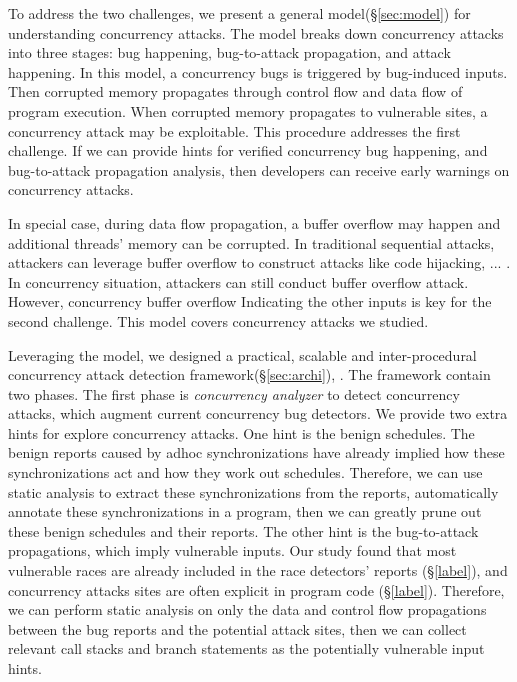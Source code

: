 
To address the two challenges, we present a general model(\S\ref{sec:model}) 
for understanding concurrency attacks.
The model breaks down concurrency attacks into three stages: bug happening, 
bug-to-attack propagation, and attack happening. 
In this model, 
a concurrency bugs is triggered by bug-induced inputs. Then corrupted memory 
propagates through control flow and data flow of program execution. 
When corrupted memory propagates to vulnerable sites, a concurrency attack may be exploitable. 
This procedure addresses the first challenge. If we can provide hints for verified concurrency bug happening, 
and bug-to-attack propagation analysis, 
then developers can receive early warnings on concurrency attacks.

In special case, 
during data flow propagation, a buffer overflow may happen and additional threads' memory can be corrupted.  
In traditional sequential attacks, attackers can leverage buffer overflow to construct attacks like 
code hijacking, ... \cite{}. In concurrency situation, attackers can still conduct buffer overflow attack. 
However, concurrency buffer overflow   
Indicating the other inputs is key for the second challenge. 
This model covers \nattacks concurrency attacks we studied. 


Leveraging the model, we designed a practical, scalable and inter-procedural concurrency 
attack detection framework(\S\ref{sec:archi}), \xxx. 
The framework contain two phases.
The first phase is \emph{concurrency analyzer} to detect concurrency attacks, 
which augment current concurrency bug detectors.  
We provide two extra hints for explore concurrency attacks.
One hint is the benign schedules. The benign reports caused by adhoc
synchronizations have already implied how these synchronizations
act and how they work out schedules. Therefore, we
can use static analysis to extract these synchronizations from
the reports, automatically annotate these synchronizations in
a program, then we can greatly prune out these benign schedules
and their reports. The other hint is the bug-to-attack propagations, which
imply vulnerable inputs. Our study found that most vulnerable
races are already included in the race detectors’ reports
(\S\ref{label}), and concurrency attacks sites are often explicit in program
code (\S\ref{label}). Therefore, we can perform static analysis
on only the data and control flow propagations between the
bug reports and the potential attack sites, then we can collect
relevant call stacks and branch statements as the potentially
vulnerable input hints.

